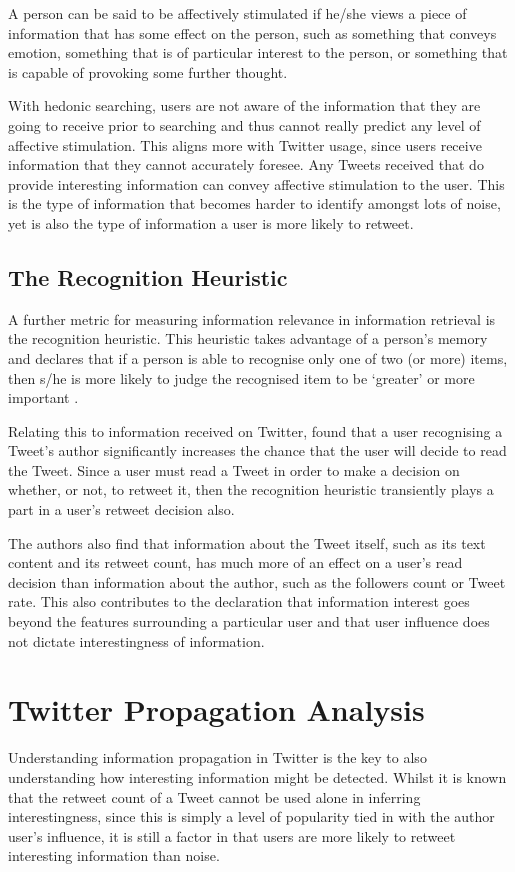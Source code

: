 A person can be said to be affectively stimulated if he/she views a piece of information that has some effect on the person, such as something that conveys emotion, something that is of particular interest to the person, or something that is capable of provoking some further thought.

With hedonic searching, users are not aware of the information that they are going to receive prior to searching and thus cannot really predict any level of affective stimulation. This aligns more with Twitter usage, since users receive information that they cannot accurately foresee. Any Tweets received that do provide interesting information can convey affective stimulation to the user. This is the type of information that becomes harder to identify amongst lots of noise, yet is also the type of information a user is more likely to retweet.


\subsection{The Recognition Heuristic} 
A further metric for measuring information relevance in information retrieval is the recognition heuristic. This heuristic takes advantage of a person's memory and declares that if a person is able to recognise only one of two (or more) items, then s/he is more likely to judge the recognised item to be `greater' or more important \cite{oppenheimer03} \cite{goldstein99}.

Relating this to information received on Twitter, \cite{chorley12} found that a user recognising a Tweet's author significantly increases the chance that the user will decide to read the Tweet. Since a user must read a Tweet in order to make a decision on whether, or not, to retweet it, then the recognition heuristic transiently plays a part in a user's retweet decision also.

The authors also find that information about the Tweet itself, such as its text content and its retweet count, has much more of an effect on a user's read decision than information about the author, such as the followers count or Tweet rate. This also contributes to the declaration that information interest goes beyond the features surrounding a particular user and that user influence does not dictate interestingness of information.


\section{Twitter Propagation Analysis}
Understanding information propagation in Twitter is the key to also understanding how interesting information might be detected. Whilst it is known that the retweet count of a Tweet cannot be used alone in inferring interestingness, since this is simply a level of popularity tied in with the author user's influence, it is still a factor in that users are more likely to retweet interesting information than noise.

